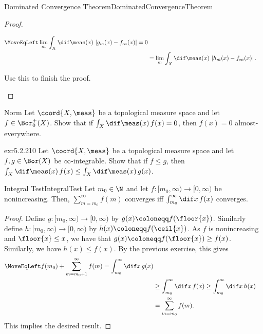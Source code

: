 \begin{thm}{Dominated Convergence Theorem}{DominatedConvergenceTheorem}
\begin{proof}
\begin{exr}[breakable=false]{}{}
\begin{equation}
\begin{split}
\MoveEqLeft
\lim _m\int _X\dif \meas (x)\, \left| g_m(x)-f_\infty (x)\right| =0 \\
& =\lim _m\int _X\dif \meas (x)\, \left| h_m(x)-f_\infty (x)\right| .
\end{split}
\end{equation}
\end{exr}
\begin{exr}{}{}
Use this to finish the proof.
\end{exr}
\end{proof}
\end{thm}

\begin{exr}{}{Norm}
Let $\coord{X,\meas}$ be a topological measure space and let $f\in \Bor _0^+(X)$.  Show that if $\int _X\dif \meas (x)\, f(x)=0$, then $f(x)=0$ almost-everywhere.
\end{exr}
\begin{exr}{}{exr5.2.210}
Let $\coord{X,\meas}$ be a topological measure space and let $f,g\in \Bor (X)$ be $\infty$-integrable.  Show that if $f\leq g$, then $\int _X\dif \meas (x)\, f(x)\leq \int _X\dif \meas (x)\, g(x)$.
\end{exr}
\begin{prp}{Integral Test}{IntegralTest}
Let $m_0\in \N$ and let $f\colon [m_0,\infty )\rightarrow  [0,\infty )$ be nonincreasing.  Then, $\sum _{m=m_0}^{\infty}f(m)$ converges iff $\int _{m_0}^{\infty}\dif x\, f(x)$ converges.
\begin{proof}
Define $g\colon [m_0,\infty )\rightarrow [0,\infty )$ by $g(x)\coloneqq f(\floor{x})$.  Similarly define $h\colon [m_0,\infty )\rightarrow [0,\infty )$ by $h(x)\coloneqq f(\ceil{x})$.  As $f$ is nonincreasing and $\floor{x}\leq x$, we have that $g(x)\coloneqq f(\floor{x})\geq f(x)$.  Similarly, we have $h(x)\leq f(x)$.  By the previous exercise, this gives
\begin{equation}
\begin{split}
\MoveEqLeft
f(m_0)+\sum _{m=m_0+1}^{\infty}f(m)=\int _{m_0}^{\infty}\dif x\, g(x) \\
& \geq \int _{m_0}^{\infty}\dif x\, f(x)\geq \int _{m_0}^{\infty}\dif x\, h(x) \\
& =\sum _{m=m_0}^{\infty}f(m).
\end{split}
\end{equation}
This implies the desired result.
\end{proof}
\end{prp}

